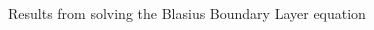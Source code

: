 \documentclass[]{aiaa-tc}%
\begin{document}
\begin{figure}[htb]
\begin{subfigmatrix}{2}
  \end{subfigmatrix}
 \label{f:p_results}
\end{figure}

\begin{figure}[htb]%
  \caption{Results from solving the Blasius Boundary Layer equation}
  \begin{subfigmatrix}{2}
  \end{subfigmatrix}
 \label{f:p_convergeplot}
\end{figure}
\end{document}
